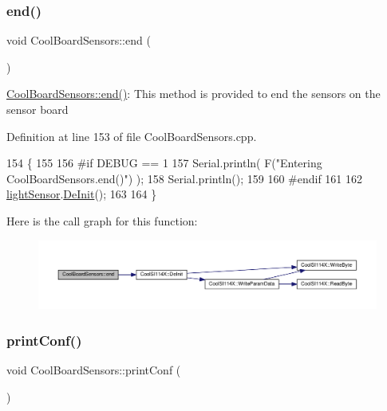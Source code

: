 \subsubsection{\texorpdfstring{end()}{end()}}
{\footnotesize\ttfamily void Cool\+Board\+Sensors\+::end (\begin{DoxyParamCaption}{ }\end{DoxyParamCaption})}

\hyperlink{class_cool_board_sensors_a4902b69f6e628bd6557193758fdd2bae}{Cool\+Board\+Sensors\+::end()}\+: This method is provided to end the sensors on the sensor board 

Definition at line 153 of file Cool\+Board\+Sensors.\+cpp.


\begin{DoxyCode}
154 \{
155 
156 \textcolor{preprocessor}{#if DEBUG == 1  }
157     Serial.println( F(\textcolor{stringliteral}{"Entering CoolBoardSensors.end()"}) );
158     Serial.println();
159 
160 \textcolor{preprocessor}{#endif}
161 
162     \hyperlink{class_cool_board_sensors_ac711c27d0927eb5e73be77f092c48be0}{lightSensor}.\hyperlink{class_cool_s_i114_x_a6840abd53a2e3d71a6bb918077c6d6e6}{DeInit}();
163 
164 \}
\end{DoxyCode}
Here is the call graph for this function\+:\nopagebreak
\begin{figure}[H]
\begin{center}
\leavevmode
\includegraphics[width=350pt]{de/d46/class_cool_board_sensors_a4902b69f6e628bd6557193758fdd2bae_cgraph}
\end{center}
\end{figure}
\mbox{\label{class_cool_board_sensors_af6fd79505815b204c178617ecf54c873}} 
\subsubsection{\texorpdfstring{print\+Conf()}{printConf()}}
{\footnotesize\ttfamily void Cool\+Board\+Sensors\+::print\+Conf (\begin{DoxyParamCaption}{ }\end{DoxyParamCaption})}

